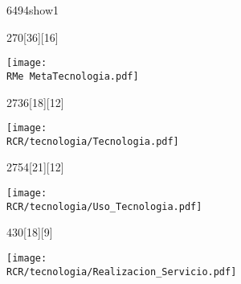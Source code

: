 \begin{NuevaPagina}{64}{94}{show1}
	\begin{NuevoParrafo}{27}{0}[36][16]
		\begin{Marco}[\LineaSupC][\LineaInfC][\LineaIzqC][\LineaDerC][CBlanco]
			\centering\texttt{[image: \\RMe MetaTecnologia.pdf]}
		\end{Marco}
	\end{NuevoParrafo}
	
	\begin{NuevoParrafo}{27}{36}[18][12]
		\begin{Marco}[\LineaSupC][\LineaInfC][\LineaIzqC][\LineaDerC][CBlanco]
			\subseccionC{\PVTec}%
			\centering\texttt{[image: \\RCR/tecnologia/Tecnologia.pdf]}
		\end{Marco}
	\end{NuevoParrafo}
	
	\begin{NuevoParrafo}{27}{54}[21][12]
		\begin{Marco}[\LineaSupC][\LineaInfC][\LineaIzqC][\LineaDerC][CBlanco]
			\subseccionC{\PVUTe}%
			\centering\texttt{[image: \\RCR/tecnologia/Uso\_Tecnologia.pdf]}
		\end{Marco}
	\end{NuevoParrafo}
	
	\begin{NuevoParrafo}{43}{0}[18][9]
		\begin{Marco}[\LineaSupC][\LineaInfC][\LineaIzqC][\LineaDerC][CBlanco]
			\subseccionC{\PVRSe}%
			\centering\texttt{[image: \\RCR/tecnologia/Realizacion\_Servicio.pdf]}
			
		\end{Marco}
	\end{NuevoParrafo}
	

\end{NuevaPagina}
